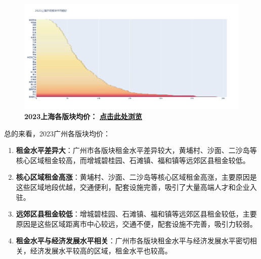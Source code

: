 \documentclass[lang=cn,11pt,a4paper]{elegantpaper}
\begin{document}
\begin{figure}[H]
    \centering
    \begin{minipage}{0.9\textwidth}
        \centering
        \includegraphics[width=\textwidth]{image/2023上海各板块.png}
        \textbf{2023上海各版块均价：} \href{https://yangchen-1318434888.cos.ap-beijing.myqcloud.com/images/2023%E4%B8%8A%E6%B5%B7%E4%B8%8D%E5%90%8C%E6%9D%BF%E5%9D%97%E5%B9%B3%E5%9D%87%E7%A7%9F%E4%BB%B7.html}{\textbf{点击此处浏览}}
    \end{minipage}
\end{figure}

总的来看，2023广州各版块均价：

\begin{enumerate}
    \item \textbf{租金水平差异大}：广州市各版块租金水平差异较大，黄埔村、沙面、二沙岛等核心区域租金较高，而增城碧桂园、石滩镇、福和镇等远郊区县租金较低。
    \item \textbf{核心区域租金高涨}：黄埔村、沙面、二沙岛等核心区域租金高涨，主要原因是这些区域地段优越，交通便利，配套设施完善，吸引了大量高端人才和企业入驻。
    \item \textbf{远郊区县租金较低}：增城碧桂园、石滩镇、福和镇等远郊区县租金较低，主要原因是这些区域距离市中心较远，交通不便，配套设施不完善，吸引力较弱。
    \item \textbf{租金水平与经济发展水平相关}：广州市各版块租金水平与经济发展水平密切相关，经济发展水平较高的区域，租金水平也较高。
\end{enumerate}
\end{document}
